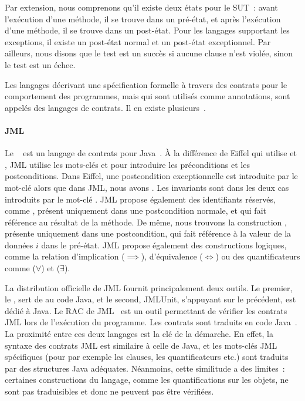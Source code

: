 Par extension, nous comprenons qu'il existe deux états pour le SUT~: avant
l'exécution d'une méthode, il se trouve dans un {\strong pré-état}, et après
l'exécution d'une méthode, il se trouve dans un {\strong post-état}. Pour les
langages supportant les exceptions, il existe un post-état normal et un
post-état exceptionnel. Par ailleurs, nous disons que le test est un {\strong
succès} si aucune clause n'est violée, sinon le test est un {\strong échec}.

Les langages décrivant une spécification formelle à travers des contrats pour
le comportement des programmes, mais qui sont utilisés comme annotations, sont
appelés des {\strong langages de contrats}. Il en existe
plusieurs~.

\paragraph{JML} Le ~ est un langage
de contrats pour Java~. À la différence de Eiffel qui utilise
 et , JML utilise les mots-clés  et
 pour introduire les préconditions et les postconditions. Dans
Eiffel, une postcondition exceptionnelle est introduite par le mot-clé
 alors que dans JML, nous avons . Les invariants sont
dans les deux cas introduits par le mot-clé . JML propose
également des identifiants réservés, comme \aresult, présent uniquement dans une
postcondition normale, et qui fait référence au résultat de la méthode.  De
même, nous trouvons la construction , présente uniquement dans une
postcondition, qui fait référence à la valeur de la données $i$ dans le
pré-état. JML propose également des constructions logiques, comme la relation
d'implication ($\implies$), d'équivalence ($\Longleftrightarrow$) ou des
quantificateurs comme  ($\forall$) et
 ($\exists$).

La distribution officielle de JML fournit principalement deux outils.  Le
premier, le , sert de
 au code Java, et le second, JMLUnit, s'appuyant sur le
précédent, est dédié à Java. Le RAC de JML~ est un outil
permettant de vérifier les contrats JML lors de l'exécution du programme. Les
contrats sont traduits en code Java~. La proximité entre ces
deux langages est la clé de la démarche. En effet, la syntaxe des contrats JML
est similaire à celle de Java, et les mots-clés JML spécifiques (pour par
exemple les clauses, les quantificateurs etc.) sont traduits par des structures
Java adéquates. Néanmoins, cette similitude a des limites~: certaines
constructions du langage, comme les quantifications sur les objets, ne sont pas
traduisibles et donc ne peuvent pas être vérifiées.

